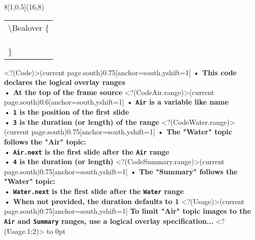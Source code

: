 \begin{textblock}{8}[1,0.5](16,8)
\begin{myCodeBox}%
\ttfamily\small
\setlength{\tabcolsep}{0mm}
\begin{tabular}{l}
\backslash Bealover \{\\
\phantom{xx}{\only<?(CodeAir.range)>{\bfseries\color{MyGreen}}\rlap{Air}\phantom{Summary} = 1 : 3,}\\
\phantom{xx}{\only<?(CodeWater.range)>{\bfseries\color{MyGreen}}\rlap{Water}\phantom{Summary} = Air.next : 4,}\\
\phantom{xx}{\only<?(CodeSummary.range)>{\bfseries\color{MyGreen}}Summary = Water.next,}\\
\}\\
\end{tabular}
\end{myCodeBox}
\end{textblock}
%
\Sticky<?(Code)>(current page.south){0.75\textwidth}[anchor=south,yshift=1\baselineskip]{\bfseries%
• This code declares the logical overlay ranges\\
• At the top of the frame source
}%
\Sticky<?(CodeAir.range)>(current page.south){0.6\textwidth}[anchor=south,yshift=1\baselineskip]{\bfseries%
• \texttt{\bfseries{Air}} is a variable like name\\
• \texttt{\bfseries{1}} is the position of the first slide\\
• \texttt{\bfseries{3}} is the duration (or length) of the range
}%
\Sticky<?(CodeWater.range)>(current page.south){0.75\textwidth}[anchor=south,yshift=1\baselineskip]{\bfseries%
• The "Water" topic follows the "Air" topic:\\
• \texttt{\bfseries{Air.next}} is the first slide after the \texttt{Air} range\\
• \texttt{\bfseries{4}} is the duration (or length)
}%
\Sticky<?(CodeSummary.range)>(current page.south){0.75\textwidth}[anchor=south,yshift=1\baselineskip]{\bfseries%
• The "Summary" follows the "Water" topic:\\
• \texttt{\bfseries{Water.next}} is the first slide after the \texttt{Water} range\\
• When not provided, the duration defaults to 1
}%
\Sticky<?(Usage)>(current page.south){0.75\textwidth}[anchor=south,yshift=1\baselineskip]{\bfseries%
To limit "Air" topic images to the \texttt{Air} and \texttt{Summary} ranges,
use a logical overlay specification...
}%
\only<?(Usage.1:2)> {
\vbox to 0pt{\hbox{%
}%
}}%
